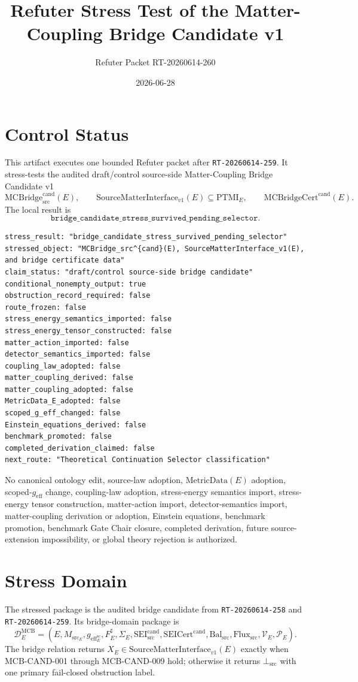 \documentclass[11pt]{article}
\title{Refuter Stress Test of the Matter-Coupling Bridge Candidate v1}
\author{Refuter Packet RT-20260614-260}
\date{2026-06-28}
\newcommand{\MetricData}{\mathrm{MetricData}}
\newcommand{\geff}{g_{\mathrm{eff}}}
\newcommand{\Msrc}{M_{\mathrm{src}}}
\newcommand{\MCBridgeCand}{\mathrm{MCBridge}_{\mathrm{src}}^{\mathrm{cand}}}
\newcommand{\MCBridgeCertCand}{\mathrm{MCBridgeCert}^{\mathrm{cand}}}
\newcommand{\SMI}{\mathrm{SourceMatterInterface}_{v1}}
\newcommand{\PTMI}{\mathrm{PTMI}}
\newcommand{\BottomSrc}{\bot_{\mathrm{src}}}
\begin{document}
\maketitle

\section{Control Status}

This artifact executes one bounded Refuter packet after
\texttt{RT-20260614-259}. It stress-tests the audited draft/control
source-side Matter-Coupling Bridge Candidate v1
\[
  \MCBridgeCand(E),
  \qquad
  \SMI(E)\subseteq\PTMI_E,
  \qquad
  \MCBridgeCertCand(E).
\]
The local result is
\[
  \texttt{bridge\_candidate\_stress\_survived\_pending\_selector}.
\]

\begin{verbatim}
stress_result: "bridge_candidate_stress_survived_pending_selector"
stressed_object: "MCBridge_src^{cand}(E), SourceMatterInterface_v1(E), and bridge certificate data"
claim_status: "draft/control source-side bridge candidate"
conditional_nonempty_output: true
obstruction_record_required: false
route_frozen: false
stress_energy_semantics_imported: false
stress_energy_tensor_constructed: false
matter_action_imported: false
detector_semantics_imported: false
coupling_law_adopted: false
matter_coupling_derived: false
matter_coupling_adopted: false
MetricData_E_adopted: false
scoped_g_eff_changed: false
Einstein_equations_derived: false
benchmark_promoted: false
completed_derivation_claimed: false
next_route: "Theoretical Continuation Selector classification"
\end{verbatim}

No canonical ontology edit, source-law adoption, \(\MetricData(E)\)
adoption, scoped-\(\geff\) change, coupling-law adoption, stress-energy
semantics import, stress-energy tensor construction, matter-action import,
detector-semantics import, matter-coupling derivation or adoption, Einstein
equations, benchmark promotion, benchmark Gate Chair closure, completed
derivation, future source-extension impossibility, or global theory rejection
is authorized.

\section{Stress Domain}

The stressed package is the audited bridge candidate from
\texttt{RT-20260614-258} and \texttt{RT-20260614-259}. Its bridge-domain
package is
\[
  \mathcal{D}^{\mathrm{MCB}}_E =
  (E,\Msrc_E,\geff_E^{\mathrm{sc}},F_E^\sharp,\Sigma_E,
  \mathrm{SEI}_{\mathrm{src}}^{\mathrm{cand}},
  \mathrm{SEICert}^{\mathrm{cand}},
  \mathrm{Bal}_{\mathrm{src}},\mathrm{Flux}_{\mathrm{src}},
  \mathcal{V}_E,\mathcal{P}_E).
\]
The bridge relation returns \(X_E\in\SMI(E)\) exactly when MCB-CAND-001
through MCB-CAND-009 hold; otherwise it returns \(\BottomSrc\) with one
primary fail-closed obstruction label.
\end{document}

